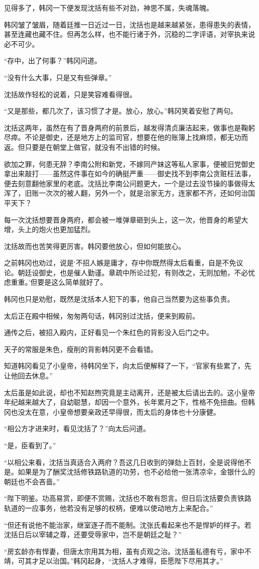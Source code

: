 见得多了，韩冈一下便发现沈括有些不对劲，神思不属，失魂落魄。

韩冈皱了皱眉，随着廷推一日近过一日，沈括也是越来越紧张，患得患失的表情，甚至连藏也藏不住。但再怎么样，也不能行诸于外，沉稳的二字评语，对宰执来说必不可少。

“存中，出了何事？”韩冈问道。

“没有什么大事，只是又有些弹章。”

沈括故作轻松的说着，只是笑容难看得很。

“又是那些，都几次了，该习惯了才是。放心，放心。”韩冈笑着安慰了两句。

沈括这两年，虽然在有了晋身两府的前景后，越发得清贞廉洁起来，做事也是鞠躬尽瘁。不论是御史，还是地方上的监司官，想要在他的账簿上找麻烦，都无功而返。但只要是在朝堂上做官，就没有不出错的时候。

欲加之罪，何患无辞？李南公附和新党，不嫁同产妹这等私人家事，便被旧党御史拿出来敲打——虽然这件事在如今的确挺严重——御史找不到李南公贪赃枉法事，便去刻意翻他家里的老底。沈括比李南公问题更大，一个是过去没节操的事做得太浑了，旧账一次次的被人翻，另外一个，就是治家无方，连家都不齐，还如何治国平天下？

每一次沈括想要晋身两府，都会被一堆弹章砸到头上，这一次，他晋身的希望大增，头上的炮火也更加猛烈。

沈括故而也苦笑得更厉害。韩冈要他放心，但如何能放心。

之前韩冈也劝过，说是‘不招人嫉是庸才，存中你既然得太后看重，自是不免议论。朝廷设御史，也是催人勤谨。章疏中所论过犯，有则改之，无则加勉，不必忧虑重重。’但要是这么简单就好了。

韩冈也只是劝慰，既然是沈括本人犯下的事，他自己当然要为这些事负责。

太后正在殿中相候，匆匆两句话，韩冈别过沈括，便来到殿前。

通传之后，被招入殿内，正好看见一个朱红色的背影没入后门之中。

天子的常服是朱色，瘦削的背影韩冈更不会看错。

知道韩冈看见了小皇帝，待韩冈坐下，向太后便解释了一下，“官家有些累了，先让他回去休息。”

太后虽是如此说，却也不知赵煦究竟是主动离开，还是被太后请出去的。这小皇帝年纪越来越大了，自幼聪慧，却因一个意外，长年累月之下，性格不免扭曲。但韩冈也没太在意，小皇帝想要亲政还早得很，而太后的身体也十分康健。

“相公方才进来时，看见沈括了？”向太后问道。

“是，臣看到了。”

“以相公来看，沈括当真适合入两府？吾这几日收到的弹劾上百封，全是说得他不是。如果是为了酬奖沈括修铁路轨道的功劳，也不必给他一张清凉伞，金银什么的朝廷也不会吝啬。”

“陛下明鉴。功高易赏，即便不赏赐，沈括也不敢有怨言。但日后沈括要负责铁路轨道的一应事务，他若没有足够的权柄，便难以使动地方上来配合。”

“但还有说他不能治家，继室逐子而不能制。沈张氏看起来也不是悍妒的样子。若沈括日后以宰辅之尊，还要受辱家中，岂不是朝廷之耻？”

“房玄龄亦有悍妻，但唐太宗用其为相，虽有贞观之治。沈括虽私德有亏，家中不靖，可其才足以治国。”韩冈起身，“沈括人才难得，臣愿陛下尽用其才。”

